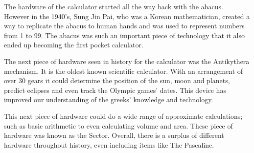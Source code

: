 \documentclass[../computer-history.tex]{subfiles}
\begin{document}
The hardware of the calculator started all the way back with the abacus. However in the 1940's, Sung Jin Pai, who was a Korean mathematician, created a way to replicate the abacus to human hands and was used to represent numbers from 1 to 99. The abacus was such an important piece of technology that it also ended up becoming the first pocket calculator.

The next piece of hardware seen in history for the calculator was the Antikythera mechanism. It is the oldest known scientific calculator. With an arrangement of over 30 gears it could determine the position of the sun, moon and planets, predict eclipses and even track the Olympic games' dates. This device has improved our understanding of the greeks' knowledge and technology.

This next piece of hardware could do a wide range of approximate calculations; such as basic arithmetic to even calculating volume and area. These piece of hardware was known as the Sector. Overall, there is a surplus of different hardware throughout history, even including items like The Pascaline. 



\biblio
\end{document}
